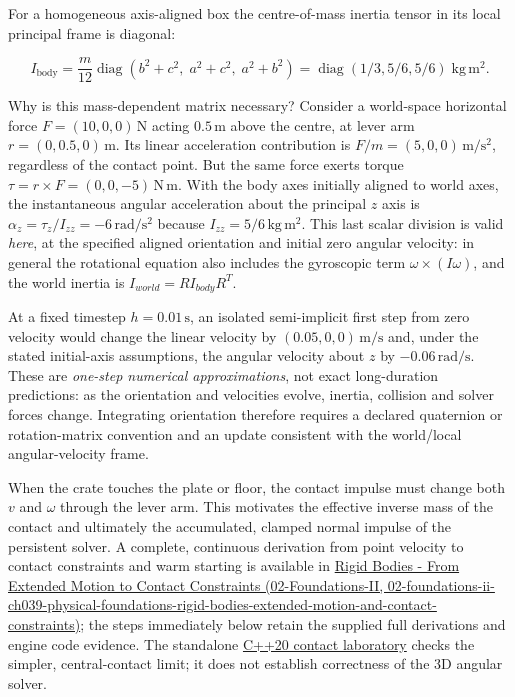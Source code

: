 For a homogeneous axis-aligned box the centre-of-mass inertia tensor in its local principal frame is diagonal:

\[
I_{\mathrm{body}}=\frac{m}{12}\operatorname{diag}(b^2+c^2,\;a^2+c^2,\;a^2+b^2)=\operatorname{diag}(1/3,5/6,5/6)\;\mathrm{kg\,m^2}.
\]

Why is this mass-dependent matrix necessary? Consider a world-space horizontal force \(F=(10,0,0)\,\mathrm N\) acting \(0.5\,\mathrm m\) above the centre, at lever arm \(r=(0,0.5,0)\,\mathrm m\). Its linear acceleration contribution is \(F/m=(5,0,0)\,\mathrm{m/s^2}\), regardless of the contact point. But the same force exerts torque \(\tau=r\times F=(0,0,-5)\,\mathrm{N\,m}\). With the body axes initially aligned to world axes, the instantaneous angular acceleration about the principal \(z\) axis is \(\alpha_z=\tau_z/I_{zz}=-6\,\mathrm{rad/s^2}\) because \(I_{zz}=5/6\,\mathrm{kg\,m^2}\). This last scalar division is valid \emph{here}, at the specified aligned orientation and initial zero angular velocity: in general the rotational equation also includes the gyroscopic term \(\omega\times(I\omega)\), and the world inertia is \(I_{world}=R I_{body}R^T\).

At a fixed timestep \(h=0.01\,\mathrm s\), an isolated semi-implicit first step from zero velocity would change the linear velocity by \((0.05,0,0)\,\mathrm{m/s}\) and, under the stated initial-axis assumptions, the angular velocity about \(z\) by \(-0.06\,\mathrm{rad/s}\). These are \emph{one-step numerical approximations}, not exact long-duration predictions: as the orientation and velocities evolve, inertia, collision and solver forces change. Integrating orientation therefore requires a declared quaternion or rotation-matrix convention and an update consistent with the world/local angular-velocity frame.

When the crate touches the plate or floor, the contact impulse must change both \(v\) and \(\omega\) through the lever arm. This motivates the effective inverse mass of the contact and ultimately the accumulated, clamped normal impulse of the persistent solver. A complete, continuous derivation from point velocity to contact constraints and warm starting is available in \href{../02-Foundations-II/main.pdf\#nameddest=02-foundations-ii-ch039-physical-foundations-rigid-bodies-extended-motion-and-contact-constraints}{Rigid Bodies - From Extended Motion to Contact Constraints (02-Foundations-II, 02-foundations-ii-ch039-physical-foundations-rigid-bodies-extended-motion-and-contact-constraints)}; the steps immediately below retain the supplied full derivations and engine code evidence. The standalone \hyperref[source-file-128143bcbfc7213e97eaefa4]{C++20 contact laboratory} checks the simpler, central-contact limit; it does not establish correctness of the 3D angular solver.


